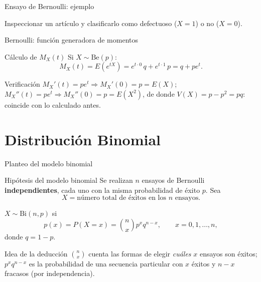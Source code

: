\documentclass[aspectratio=169,11pt]{beamer}
\begin{document}
\begin{frame}{Ensayo de Bernoulli: ejemplo}
\begin{example}
Inspeccionar un artículo y clasificarlo como defectuoso ($X=1$) o no ($X=0$).
\end{example}
\end{frame}

\begin{frame}{Bernoulli: función generadora de momentos}
\begin{block}{Cálculo de $M_X(t)$}
Si $X\sim\text{Be}(p)$:
$$M_X(t) = E(e^{tX}) = e^{t\cdot 0}\,q + e^{t\cdot 1}\,p = q+pe^t.$$
\end{block}

\begin{alertblock}{Verificación}
$M_X'(t)=pe^t \Rightarrow M_X'(0)=p=E(X)$; $M_X''(t)=pe^t \Rightarrow M_X''(0)=p=E(X^2)$, de donde $V(X)=p-p^2=pq$: coincide con lo calculado antes.
\end{alertblock}
\end{frame}

\section{Distribución Binomial}

\begin{frame}{Planteo del modelo binomial}
\begin{block}{Hipótesis del modelo binomial}
Se realizan $n$ ensayos de Bernoulli \textbf{independientes}, cada uno con la misma probabilidad de éxito $p$. Sea
$$X = \text{número total de éxitos en los $n$ ensayos}.$$
\end{block}

\begin{definition}
$X \sim \text{Bi}(n,p)$ si
$$p(x) = P(X=x) = \binom{n}{x} p^x q^{n-x}, \qquad x=0,1,\dots,n,$$
donde $q=1-p$.
\end{definition}

\begin{alertblock}{Idea de la deducción}
$\binom{n}{x}$ cuenta las formas de elegir \emph{cuáles} $x$ ensayos son éxitos; $p^x q^{n-x}$ es la probabilidad de una secuencia particular con $x$ éxitos y $n-x$ fracasos (por independencia).
\end{alertblock}
\end{frame}
\end{document}
